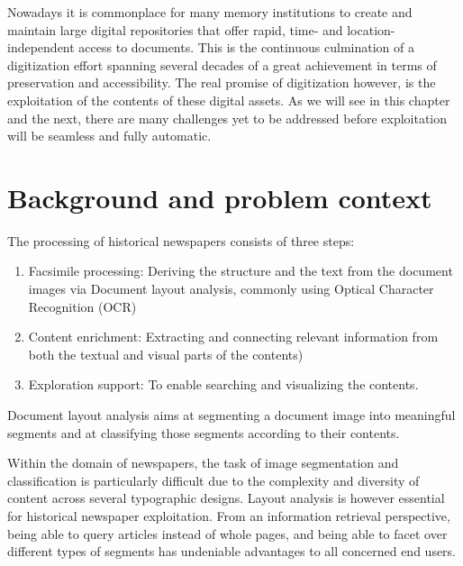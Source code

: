 \documentclass[english, bibtex]{kththesis}
\begin{document}
Nowadays it is commonplace for many memory institutions to create and maintain large digital repositories that offer rapid, time- and location-independent access to documents. This is the continuous culmination of a digitization effort spanning several decades of a great achievement in terms of preservation and accessibility. The real promise of digitization however, is the exploitation of the contents of these digital assets\cite{jdmdh:7097}. As we will see in this chapter and the next, there are many challenges yet to be addressed before exploitation will be seamless and fully automatic. 

\section{Background and problem context}
\label{sec:background}

The processing of historical newspapers consists of three steps: 
\begin{enumerate}
\item Facsimile processing: Deriving the structure and the text from the document images via Document layout analysis, commonly using Optical Character Recognition (\gls{OCR})
\item Content enrichment: Extracting and connecting relevant information from both the textual and visual parts of the contents)
\item Exploration support: To enable searching and visualizing the contents.  
\end{enumerate}

Document layout analysis aims at segmenting a document image into meaningful segments and at classifying those segments according to their contents. \cite{ESKENAZI20171} 
    
Within the domain of newspapers, the task of image segmentation and classification is particularly difficult due to the complexity and diversity of content across several typographic designs. Layout analysis is however essential for historical newspaper exploitation. From an information retrieval perspective, being able to query articles instead of whole pages, and being able to facet over different types of segments has undeniable advantages to all concerned end users. 

\end{document}
